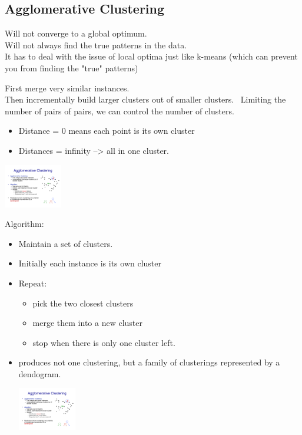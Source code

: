 \subsection{Agglomerative Clustering}
Will not converge to a global optimum. \hfill \\  %
Will not always find the true patterns in the data.  \hfill \\  %
It has to deal with the issue of local optima just like k-means (which can prevent you from finding the "true" patterns)


First merge very similar instances. \hfill \\
Then incrementally build larger clusters out of smaller clusters. \hfill \
Limiting the number of pairs of pairs, we can control the number of clusters.
\begin{itemize} 
	\item Distance = 0 means each point is its own cluster
        \item Distances = infinity --> all in one cluster. 
\end{itemize}

\includegraphics[width=1.0in]{figures/agg_clustering.pdf}

Algorithm:
\begin{itemize}
	\item Maintain a set of clusters.
	\item Initially each instance is its own cluster
	\item Repeat:
		\begin{itemize}
			\item pick the two closest clusters
			\item merge them into a new cluster
			\item stop when there is only one cluster left. 
		\end{itemize}
	\item produces not one clustering, but a family of clusterings represented by a dendogram.
		
		\includegraphics[width=1.0in]{figures/dendogram.pdf}
\end{itemize}

